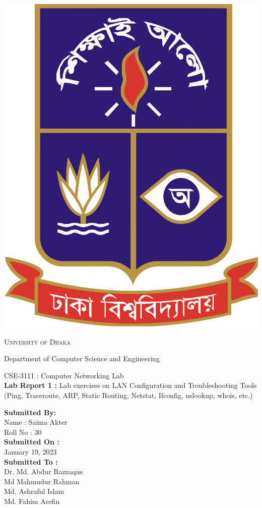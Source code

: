 \documentclass[11pt]{article}
\begin{document}
\begin{titlepage}
	\begin{center}
    	\includegraphics[scale=0.10]{du.png}\par
		\begin{Huge}
			\textsc{University of Dhaka}\par
		\end{Huge}
		\begin{Large}
			Department of Computer Science and Engineering\par \vspace{1cm}
			CSE-3111 : Computer Networking Lab \\[12pt]	
			\textbf{Lab Report 1 :} Lab exercises on LAN Configuration and Troubleshooting Tools (Ping, Traceroute, ARP, Static Routing, Netstat, Ifconfig, nslookup, whois, etc.)
		\end{Large}
	\end{center}  	
	\begin{large}
		\textbf{Submitted By:\\[12pt]}
			Name : Saima Akter\\[8pt]
			Roll No : 30\\[12pt]
		\textbf{Submitted On : \\[12pt]}
			January 19, 2023\\[20pt]
		\textbf{Submitted To :\\[12pt]}
			Dr. Md. Abdur Razzaque\\[12pt]
                Md Mahmudur Rahman\\[12pt]
                Md. Ashraful Islam\\[12pt]
                Md. Fahim Arefin
	\end{large}
\end{titlepage}
\end{document}
